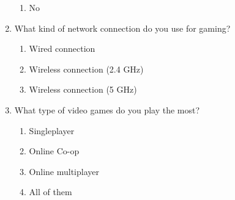 \documentclass[]{report}
\begin{document}
\begin{enumerate}
\begin{enumerate}
			\item No
		\end{enumerate}
		\item What kind of network connection do you use for gaming?
		\begin{enumerate}
			\item Wired connection
			\item Wireless connection (2.4 GHz)
			\item Wireless connection (5 GHz)
		\end{enumerate}
		\item What type of video games do you play the most?
		\begin{enumerate}
			\item Singleplayer
			\item Online Co-op
			\item Online multiplayer
			\item All of them
		\end{enumerate}
	\end{enumerate}

	
\end{document}
